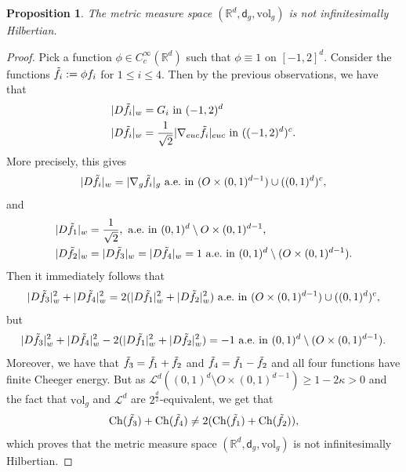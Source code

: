 \documentclass[a4paper,10pt]{article}
\newtheorem{proposition}[theorem]{Proposition}
\numberwithin{equation}{section}
\newcommand{\R}{\mathbb{R}}
\newcommand{\vol}{\mathrm{vol}}
\newcommand{\Ch}{\mathrm{Ch}}
\newcommand{\sfd}{\mathsf d}
\begin{document}
\begin{proposition}\label{first_non_infinitesimally_hilb}
    The metric measure space $(\R^d, \sfd_g, \vol_g)$ is not infinitesimally Hilbertian. 
\end{proposition}
\begin{proof}
    Pick a function $\phi \in C_c^\infty(\R^d)$ such that $\phi \equiv 1$ on $[-1, 2]^d$. Consider the functions $\Tilde{f}_i := \phi f_i$ for $1 \leq i \leq 4$. Then by the previous observations, we have that 
    \begin{align*}
        &|D\Tilde{f}_i|_w = G_i \ \mathrm{in}\ (-1, 2)^d\\
        &|D\Tilde{f}_i|_w = \frac{1}{\sqrt{2}}|\nabla_{euc} \Tilde{f}_i|_{euc} \ \mathrm{in}\ ((-1,2)^d)^c.
    \end{align*}
    More precisely, this gives
    \begin{align}
        |D\Tilde{f}_i|_w= |\nabla_g \Tilde{f}_i|_g \ \mathrm{a.e.\ in} \ (O\times(0,1)^{d-1}) \cup ((0,1)^{d})^c,
    \end{align}
    and
    \begin{align*}
        &|D\Tilde{f}_1|_w= \frac{1}{\sqrt{2}}, \ \mathrm{a.e.\ in} \ (0,1)^{d}\setminus O\times(0,1)^{d-1}, \\
        &|D\Tilde{f}_2|_w=|D\Tilde{f}_3|_w=|D\Tilde{f}_4|_w=1 \ \mathrm{a.e.\ in} \ (0,1)^{d}\setminus (O\times(0,1)^{d-1}).
    \end{align*}
    Then it immediately follows that 
    \begin{align}
    |D\Tilde{f}_3|_w^2 + |D\Tilde{f}_4|_w^2 = 2(|D\Tilde{f}_1|_w^2 + |D\Tilde{f}_2|_w^2)   \ \mathrm{a.e.\ in} \ (O\times(0,1)^{d-1}) \cup ((0,1)^{d})^c,
    \end{align}
    but 
    \begin{align}
        |D\Tilde{f}_3|_w^2 + |D\Tilde{f}_4|_w^2 - 2(|D\Tilde{f}_1|_w^2 + |D\Tilde{f}_2|_w^2) = -1 \ \mathrm{a.e.\ in} \ (0,1)^{d}\setminus (O\times(0,1)^{d-1}).
    \end{align}
    Moreover, we have that $\Tilde{f}_3 = \Tilde{f}_1 + \Tilde{f}_2$ and $\Tilde{f}_4 = \Tilde{f}_1 - \Tilde{f}_2$ and all four functions have finite Cheeger energy.
    But as $\mathcal{L}^d((0,1)^{d}\setminus O\times(0,1)^{d-1})\geq 1-2\kappa >0$ and the fact that $\vol_g$ and $\mathcal{L}^d$ are $2^{\frac{d}{2}}$-equivalent, we get that 
    \begin{align}
        \Ch(\Tilde{f}_3) + \Ch(\Tilde{f}_4) \neq 2(\Ch(\Tilde{f}_1) + \Ch(\Tilde{f}_2)),
    \end{align}
    which proves that the metric measure space $(\R^d, \sfd_g,  \vol_g)$ is not infinitesimally Hilbertian.
\end{proof}
\end{document}
